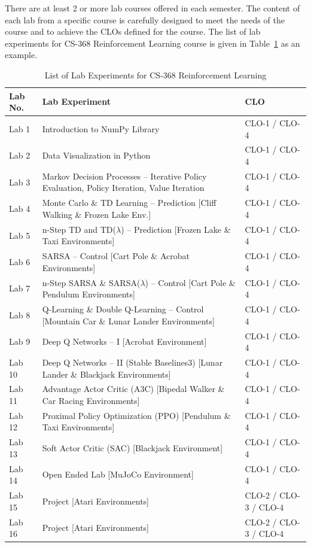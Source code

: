 There are at least 2 or more lab courses offered in each semester. The content of each lab from a specific course is carefully designed to meet the needs of the course and to achieve the CLOs defined for the course. The list of lab experiments for CS-368 Reinforcement Learning course is given in Table~\ref{tab:List_of_Lab_Experiments_for_CS_368_Reinforcement_Learning} as an example.

\begin{table}[H]
\centering
\small %
\caption{List of Lab Experiments for CS-368 Reinforcement Learning}
\label{tab:List_of_Lab_Experiments_for_CS_368_Reinforcement_Learning}
\begin{tabular}{>{\centering\arraybackslash}p{}
                >{\raggedright\arraybackslash}p{}
                >{\centering\arraybackslash}p{}}
\toprule
\textbf{Lab No.} & \textbf{Lab Experiment} & \textbf{CLO} \\
\midrule
Lab 1  & Introduction to NumPy Library & CLO-1 / CLO-4 \\
Lab 2  & Data Visualization in Python & CLO-1 / CLO-4 \\
Lab 3  & Markov Decision Processes -- Iterative Policy Evaluation, Policy Iteration, Value Iteration & CLO-1 / CLO-4 \\
Lab 4  & Monte Carlo \& TD Learning -- Prediction [Cliff Walking \& Frozen Lake Env.] & CLO-1 / CLO-4 \\
Lab 5  & n-Step TD and TD($\lambda$) -- Prediction [Frozen Lake \& Taxi Environments] & CLO-1 / CLO-4 \\
Lab 6  & SARSA -- Control [Cart Pole \& Acrobat Environments] & CLO-1 / CLO-4 \\
Lab 7  & n-Step SARSA \& SARSA($\lambda$) -- Control [Cart Pole \& Pendulum Environments] & CLO-1 / CLO-4 \\
Lab 8  & Q-Learning \& Double Q-Learning -- Control [Mountain Car \& Lunar Lander Environments] & CLO-1 / CLO-4 \\
Lab 9  & Deep Q Networks -- I [Acrobat Environment] & CLO-1 / CLO-4 \\
Lab 10 & Deep Q Networks -- II (Stable Baselines3) [Lunar Lander \& Blackjack Environments] & CLO-1 / CLO-4 \\
Lab 11 & Advantage Actor Critic (A3C) [Bipedal Walker \& Car Racing Environments] & CLO-1 / CLO-4 \\
Lab 12 & Proximal Policy Optimization (PPO) [Pendulum \& Taxi Environments] & CLO-1 / CLO-4 \\
Lab 13 & Soft Actor Critic (SAC) [Blackjack Environment] & CLO-1 / CLO-4 \\
Lab 14 & Open Ended Lab [MuJoCo Environment] & CLO-1 / CLO-4 \\
Lab 15 & Project [Atari Environments] & CLO-2 / CLO-3 / CLO-4 \\
Lab 16 & Project [Atari Environments] & CLO-2 / CLO-3 / CLO-4 \\
\bottomrule
\end{tabular}
\end{table}

